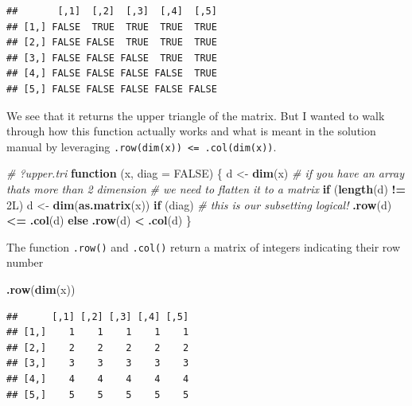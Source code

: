 \documentclass[]{book}
\newenvironment{Shaded}{\begin{snugshade}}{\end{snugshade}}
\newcommand{\CommentTok}[1]{\textcolor[rgb]{0.56,0.35,0.01}{\textit{#1}}}
\newcommand{\ControlFlowTok}[1]{\textcolor[rgb]{0.13,0.29,0.53}{\textbf{#1}}}
\newcommand{\DataTypeTok}[1]{\textcolor[rgb]{0.13,0.29,0.53}{#1}}
\newcommand{\KeywordTok}[1]{\textcolor[rgb]{0.13,0.29,0.53}{\textbf{#1}}}
\newcommand{\NormalTok}[1]{#1}
\newcommand{\OperatorTok}[1]{\textcolor[rgb]{0.81,0.36,0.00}{\textbf{#1}}}
\newcommand{\OtherTok}[1]{\textcolor[rgb]{0.56,0.35,0.01}{#1}}
\newcommand{\StringTok}[1]{\textcolor[rgb]{0.31,0.60,0.02}{#1}}
\begin{document}
\begin{verbatim}
##       [,1]  [,2]  [,3]  [,4]  [,5]
## [1,] FALSE  TRUE  TRUE  TRUE  TRUE
## [2,] FALSE FALSE  TRUE  TRUE  TRUE
## [3,] FALSE FALSE FALSE  TRUE  TRUE
## [4,] FALSE FALSE FALSE FALSE  TRUE
## [5,] FALSE FALSE FALSE FALSE FALSE
\end{verbatim}

We see that it returns the upper triangle of the matrix. But I wanted to walk through how this function actually works and what is meant in the solution manual by leveraging \texttt{.row(dim(x))\ \textless{}=\ .col(dim(x))}.

\begin{Shaded}
\begin{Highlighting}[]
\CommentTok{# ?upper.tri}
\ControlFlowTok{function}\NormalTok{ (x, }\DataTypeTok{diag =} \OtherTok{FALSE}\NormalTok{) }
\NormalTok{\{}
\NormalTok{    d <-}\StringTok{ }\KeywordTok{dim}\NormalTok{(x)}
    \CommentTok{# if you have an array thats more than 2 dimension}
    \CommentTok{# we need to flatten it to a matrix}
    \ControlFlowTok{if}\NormalTok{ (}\KeywordTok{length}\NormalTok{(d) }\OperatorTok{!=}\StringTok{ }\NormalTok{2L) }
\NormalTok{        d <-}\StringTok{ }\KeywordTok{dim}\NormalTok{(}\KeywordTok{as.matrix}\NormalTok{(x))}
    \ControlFlowTok{if}\NormalTok{ (diag) }
      \CommentTok{# this is our subsetting logical!}
         \KeywordTok{.row}\NormalTok{(d) }\OperatorTok{<=}\StringTok{ }\KeywordTok{.col}\NormalTok{(d)}
    \ControlFlowTok{else} \KeywordTok{.row}\NormalTok{(d) }\OperatorTok{<}\StringTok{ }\KeywordTok{.col}\NormalTok{(d)}
\NormalTok{\}}
\end{Highlighting}
\end{Shaded}

The function \texttt{.row()} and \texttt{.col()} return a matrix of integers indicating their row number

\begin{Shaded}
\begin{Highlighting}[]
\KeywordTok{.row}\NormalTok{(}\KeywordTok{dim}\NormalTok{(x))}
\end{Highlighting}
\end{Shaded}

\begin{verbatim}
##      [,1] [,2] [,3] [,4] [,5]
## [1,]    1    1    1    1    1
## [2,]    2    2    2    2    2
## [3,]    3    3    3    3    3
## [4,]    4    4    4    4    4
## [5,]    5    5    5    5    5
\end{verbatim}
\end{document}
